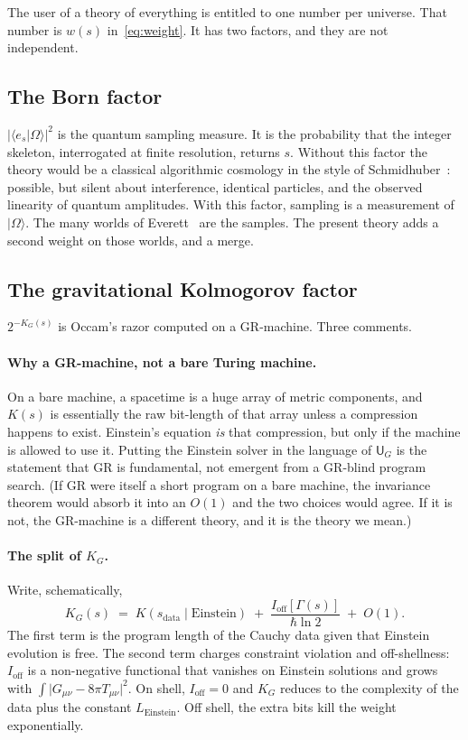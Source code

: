 \documentclass[11pt,a4paper]{article}
\theoremstyle{plain}
\theoremstyle{definition}
\theoremstyle{remark}
\newcommand{\KG}{K_{G}}
\newcommand{\UTM}{\mathsf{U}_{G}}
\newcommand{\abs}[1]{\lvert#1\rvert}
\newcommand{\ket}[1]{\lvert#1\rangle}
\newcommand{\braket}[2]{\langle#1|#2\rangle}
\begin{document}
The user of a theory of everything is entitled to one number per universe.
That number is $w(s)$ in~\eqref{eq:weight}.
It has two factors, and they are not independent.

\subsection{The Born factor}

$\abs{\braket{e_{s}}{\Omega}}^{2}$ is the quantum sampling measure.
It is the probability that the integer skeleton, interrogated at finite resolution, returns $s$.
Without this factor the theory would be a classical algorithmic cosmology in the style of Schmidhuber~\cite{schmidhuber2000}: possible, but silent about interference, identical particles, and the observed linearity of quantum amplitudes.
With this factor, sampling is a measurement of $\ket{\Omega}$.
The many worlds of Everett~\cite{everett1957} are the samples.
The present theory adds a second weight on those worlds, and a merge.

\subsection{The gravitational Kolmogorov factor}

$2^{-\KG(s)}$ is Occam's razor computed on a GR-machine.
Three comments.

\paragraph{Why a GR-machine, not a bare Turing machine.}
On a bare machine, a spacetime is a huge array of metric components, and $K(s)$ is essentially the raw bit-length of that array unless a compression happens to exist.
Einstein's equation \emph{is} that compression, but only if the machine is allowed to use it.
Putting the Einstein solver in the language of $\UTM$ is the statement that GR is fundamental, not emergent from a GR-blind program search.
(If GR were itself a short program on a bare machine, the invariance theorem would absorb it into an $O(1)$ and the two choices would agree.
If it is not, the GR-machine is a different theory, and it is the theory we mean.)

\paragraph{The split of $\KG$.}
Write, schematically,
\begin{equation}
  \KG(s) \;=\; K(s_{\mathrm{data}}\mid \text{Einstein}) \;+\; \frac{I_{\mathrm{off}}[\Gamma(s)]}{\hbar\ln 2} \;+\; O(1).
  \label{eq:KG-split}
\end{equation}
The first term is the program length of the Cauchy data given that Einstein evolution is free.
The second term charges constraint violation and off-shellness: $I_{\mathrm{off}}$ is a non-negative functional that vanishes on Einstein solutions and grows with $\int\abs{G_{\mu\nu}-8\pi T_{\mu\nu}}^{2}$.
On shell, $I_{\mathrm{off}}=0$ and $\KG$ reduces to the complexity of the data plus the constant $L_{\mathrm{Einstein}}$.
Off shell, the extra bits kill the weight exponentially.
\end{document}
